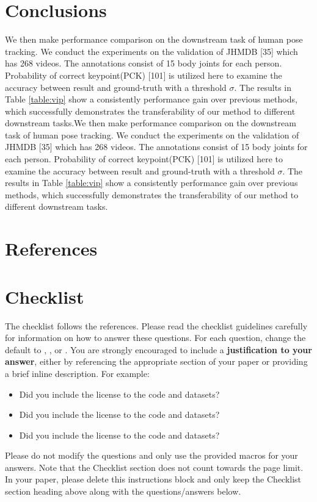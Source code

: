 \documentclass{article}
\begin{document}
\section{Conclusions}
We then make performance comparison on the downstream task of human pose tracking. We conduct the experiments on the validation of JHMDB [35] which has 268 videos. The annotations consist of 15 body joints for each person. Probability of correct keypoint(PCK) [101] is utilized here to examine the accuracy between result and  ground-truth with a threshold $\sigma $. The results in Table \ref{table:vip} show a consistently performance gain over previous methods, which successfully demonstrates the transferability of our method to different downstream tasks.We then make performance comparison on the downstream task of human pose tracking. We conduct the experiments on the validation of JHMDB [35] which has 268 videos. The annotations consist of 15 body joints for each person. Probability of correct keypoint(PCK) [101] is utilized here to examine the accuracy between result and  ground-truth with a threshold $\sigma $. The results in Table \ref{table:vip} show a consistently performance gain over previous methods, which successfully demonstrates the transferability of our method to different downstream tasks.

\section*{References}
\medskip


{
\small


}


\section*{Checklist}


The checklist follows the references.  Please
read the checklist guidelines carefully for information on how to answer these
questions.  For each question, change the default \answerTODO{} to \answerYes{},
\answerNo{}, or \answerNA{}.  You are strongly encouraged to include a {\bf
justification to your answer}, either by referencing the appropriate section of
your paper or providing a brief inline description.  For example:
\begin{itemize}
  \item Did you include the license to the code and datasets? \answerYes
  \item Did you include the license to the code and datasets? 
  \item Did you include the license to the code and datasets? \answerNA{}
\end{itemize}
Please do not modify the questions and only use the provided macros for your
answers.  Note that the Checklist section does not count towards the page
limit.  In your paper, please delete this instructions block and only keep the
Checklist section heading above along with the questions/answers below.
\end{document}

